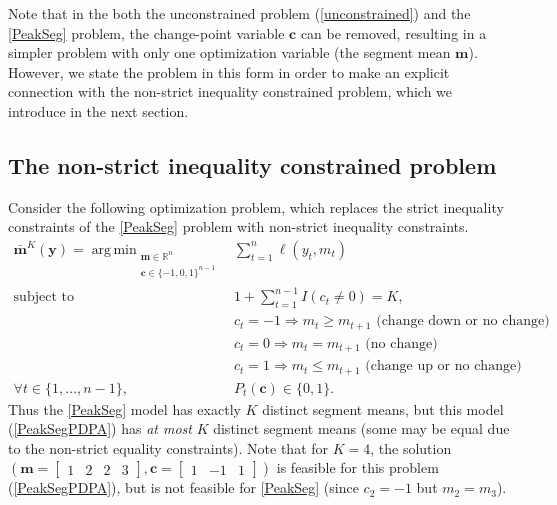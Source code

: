 \documentclass{article}
\DeclareMathOperator*{\argmin}{arg\,min}
\newcommand{\RR}{\mathbb R}
\begin{document}
Note that in the both the unconstrained problem (\ref{unconstrained})
and the \ref{PeakSeg} problem, the change-point variable $\mathbf c$
can be removed, resulting in a simpler problem with only one
optimization variable (the segment mean $\mathbf m$). However, we
state the problem in this form in order to make an explicit connection
with the non-strict inequality constrained problem, which we introduce
in the next section.

\subsection{The non-strict inequality constrained problem}

Consider the following optimization problem, which replaces the strict
inequality constraints of the \ref{PeakSeg} problem with non-strict
inequality constraints.
\begin{align}
  \mathbf{\bar m}^K(\mathbf y) =
    \argmin_{\substack{
  \mathbf m\in\RR^{n}
\\
  \mathbf c\in\{-1,0,1\}^{n-1}
  }} &\ \ 
    \sum_{t=1}^n \ell(y_t, m_t) 
       \label{PeakSegPDPA}
\\
    \text{subject to} &\ \  1+ \sum_{t=1}^{n-1} I(c_t \neq 0) = K, 
\nonumber\\
& \ \ c_t = -1 \Rightarrow m_{t} \geq m_{t+1} \text{ (change down or no change)}
\nonumber\\
& \ \ c_t = 0 \Rightarrow m_{t} = m_{t+1}  \text{ (no change)}
\nonumber\\
& \ \ c_t = 1 \Rightarrow m_{t} \leq m_{t+1} \text{ (change up or no change)}
\nonumber\\
\forall t\in\{1, \dots, n-1\}, &\ \ P_t(\mathbf c) \in\{0, 1\}.
\nonumber
\end{align}
Thus the \ref{PeakSeg} model has exactly $K$ distinct
segment means, but this model (\ref{PeakSegPDPA}) has \emph{at most}
$K$ distinct segment means (some may be equal due to the non-strict
equality constraints). Note that for $K=4$, the solution
$(\mathbf m = \left[\begin{array}{cccc}1 & 2 & 2 & 3 \end{array}\right],
  \mathbf c = \left[\begin{array}{ccc}  1 & -1 & 1 \end{array}\right])$
is feasible for this problem (\ref{PeakSegPDPA}), 
but is not feasible for \ref{PeakSeg} (since $c_2=-1$ but $m_2 = m_3$).
\end{document}
